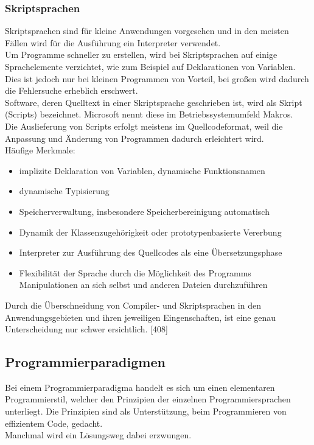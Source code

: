 \documentclass[12pt,a4paper]{report}
\begin{document}
\begin{onehalfspace}
\subsubsection{Skriptsprachen}
Skriptsprachen sind für kleine Anwendungen vorgesehen und in den meisten Fällen wird für die Ausführung ein Interpreter verwendet.\\
Um Programme schneller zu erstellen, wird bei Skriptsprachen auf einige Sprachelemente verzichtet, wie zum Beispiel auf Deklarationen von Variablen. Dies ist jedoch nur bei kleinen Programmen von Vorteil, bei großen wird dadurch die Fehlersuche erheblich erschwert.\\
Software, deren Quelltext in einer Skriptsprache geschrieben ist, wird als Skript (Scripts) bezeichnet. Microsoft nennt diese im Betriebssystemumfeld Makros.\\
Die Auslieferung von Scripts erfolgt meistens im Quellcodeformat, weil die Anpassung und Änderung von Programmen dadurch erleichtert wird.
\\Häufige Merkmale:
\begin{itemize}
\item implizite Deklaration von Variablen, dynamische Funktionsnamen
\item dynamische Typisierung
\item Speicherverwaltung, insbesondere Speicherbereinigung automatisch
\item Dynamik der Klassenzugehörigkeit oder prototypenbasierte Vererbung
\item Interpreter zur Ausführung des Quellcodes als eine Übersetzungsphase
\item Flexibilität der Sprache durch die Möglichkeit des Programms Manipulationen an sich selbst und anderen Dateien durchzuführen
\end{itemize}
Durch die Überschneidung von Compiler- und Skriptsprachen in den Anwendungsgebieten und ihren jeweiligen Eingenschaften, ist eine genau Unterscheidung nur schwer ersichtlich. [408]

\subsection{Programmierparadigmen}
Bei einem Programmierparadigma handelt es sich um einen elementaren Programmierstil, welcher den Prinzipien der einzelnen Programmiersprachen unterliegt. Die Prinzipien sind als Unterstützung, beim Programmieren von effizientem Code, gedacht.
\\Manchmal wird ein Lösungsweg dabei erzwungen.\\


\end{onehalfspace}
\end{document}
